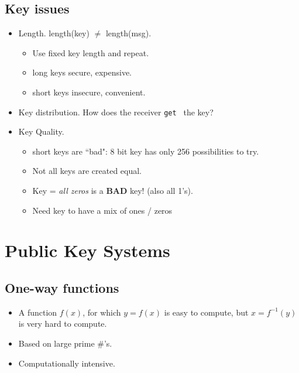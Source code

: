 \documentclass{article}	%
\begin{document}
\subsection{Key issues}
\begin{itemize}
	\item Length.  length(key) $\ne$ length(msg).
        \begin{itemize}
        	\item Use fixed key length and repeat.
                \item long keys secure, expensive.
                \item short keys insecure, convenient.
         \end{itemize}

         \item Key distribution.  How does the receiver
         {\tt get } the key?

         \item Key Quality.
         \begin{itemize}
                \item short keys are ``bad":   
8 bit key has only 256 possibilities to try.	%
         	\item Not all keys are created equal.
                \item Key = {\it all zeros} is a {\bf BAD} key!
                (also all 1's).
                \item Need key to have a mix of ones / zeros
 
          \end{itemize}
  \end{itemize}


\section{Public Key Systems}

\subsection{One-way functions}

\begin{itemize}
	\item A function $f(x)$, for which $y = f(x)$ is easy to 
compute, but $x = f^{-1}(y)$ is very hard to compute. 
	\item Based on large prime \#'s.
	\item Computationally intensive.
\end{itemize}
\end{document}
